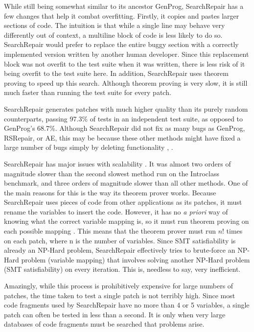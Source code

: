 \documentclass{paper}
\begin{document}
While still being somewhat similar to its ancestor GenProg, SearchRepair has a few changes that help it combat overfitting. 
Firstly, it copies and pastes larger sections of code. 
The intuition is that while a single line may behave very differently out of context, a multiline block of code is less likely to do so. 
SearchRepair would prefer to replace the entire buggy section with a correctly implemented version written by another human developer. 
Since this replacement block was not overfit to the test suite when it was written, there is less risk of it being overfit to the test suite here. 
In addition, SearchRepair uses theorem proving to speed up this search. 
Although theorem proving is very slow, it is still much faster than running the test suite for every patch. 

SearchRepair generates patches with much higher quality than its purely random counterparts, passing 97.3\% of tests in an independent test suite, as opposed to GenProg's 68.7\%. 
Although SearchRepair did not fix as many bugs as GenProg, RSRepair, or AE, this may be because these other methods might have fixed a large number of bugs simply by deleting functionality \cite{SearchRepair}, \cite{Patch plausibility}. 


SearchRepair has major issues with scalability \cite{SR thesis}. 
It was almost two orders of magnitude slower than the second slowest method run on the Introclass benchmark, and three orders of magnitude slower than all other methods. 
One of the main reasons for this is the way its theorem prover works. 
Because SearchRepair uses pieces of code from other applications as its patches, it must rename the variables to insert the code. 
However, it has no \textit{a priori} way of knowing what the correct variable mapping is, so it must run theorem proving on each possible mapping \cite{SR thesis}. 
This means that the theorem prover must run $n!$ times on each patch, where n is the number of variables. 
Since SMT satisfiability is already an NP-Hard problem, SearchRepair effectively tries to brute-force an NP-Hard problem (variable mapping) that involves solving another NP-Hard problem (SMT satisfiability) on every iteration. 
This is, needless to say, very inefficient. 

Amazingly, while this process is prohibitively expensive for large numbers of patches, the time taken to test a single patch is not terribly high. 
Since most code fragments used by SearchRepair have no more than 4 or 5 variables, a single patch can often be tested in less than a second. 
It is only when very large databases of code fragments must be searched that problems arise.
\end{document}
